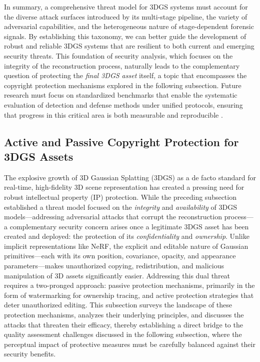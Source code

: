 \documentclass[11pt]{article}
\begin{document}
In summary, a comprehensive threat model for 3DGS systems must account for the diverse attack surfaces introduced by its multi-stage pipeline, the variety of adversarial capabilities, and the heterogeneous nature of stage-dependent forensic signals. By establishing this taxonomy, we can better guide the development of robust and reliable 3DGS systems that are resilient to both current and emerging security threats. This foundation of security analysis, which focuses on the integrity of the reconstruction process, naturally leads to the complementary question of protecting the \emph{final 3DGS asset} itself, a topic that encompasses the copyright protection mechanisms explored in the following subsection. Future research must focus on standardized benchmarks that enable the systematic evaluation of detection and defense methods under unified protocols, ensuring that progress in this critical area is both measurable and reproducible \cite{ref712,ref717}.

\subsection{Active and Passive Copyright Protection for 3DGS Assets}

The explosive growth of 3D Gaussian Splatting (3DGS) as a de facto standard for real-time, high-fidelity 3D scene representation has created a pressing need for robust intellectual property (IP) protection. While the preceding subsection established a threat model focused on the \emph{integrity} and \emph{availability} of 3DGS models---addressing adversarial attacks that corrupt the reconstruction process---a complementary security concern arises once a legitimate 3DGS asset has been created and deployed: the protection of its \emph{confidentiality} and \emph{ownership}. Unlike implicit representations like NeRF, the explicit and editable nature of Gaussian primitives---each with its own position, covariance, opacity, and appearance parameters---makes unauthorized copying, redistribution, and malicious manipulation of 3D assets significantly easier. Addressing this dual threat requires a two-pronged approach: passive protection mechanisms, primarily in the form of watermarking for ownership tracing, and active protection strategies that deter unauthorized editing. This subsection surveys the landscape of these protection mechanisms, analyzes their underlying principles, and discusses the attacks that threaten their efficacy, thereby establishing a direct bridge to the quality assessment challenges discussed in the following subsection, where the perceptual impact of protective measures must be carefully balanced against their security benefits.
\end{document}
